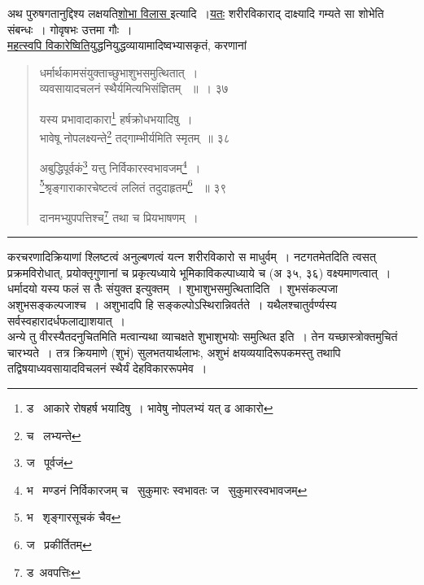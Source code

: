 \documentclass[11pt, openany]{book}
\begin{document}
अथ पुरुषगतानुद्दिश्य लक्षयति\underline{शोभा विलास }इत्यादि~।\underline{यतः} शरीरविकाराद् दाक्ष्यादि गम्यते सा शोभेति संबन्धः~। गोवृषभः उत्तमा गौः~। \\

\underline{महत्स्वपि विकारेष्विति}युद्धनियुद्धव्यायामादिष्वभ्यासकृतं, करणानां 

\newpage

\begin{quote}
 {\na धर्मार्थकामसंयुक्ताच्छुभाशुभसमुत्थितात्~। \\
व्यवसायादचलनं स्थैर्यमित्यभिसंज्ञितम् ~॥~। ३७ 

यस्य प्रभावादाकारा\renewcommand{\thefootnote}{1}\footnote{ड \textendash\ आकारे रोषहर्ष भयादिषु~। भावेषु नोपलभ्यं यत् ढ आकारो } हर्षक्रोधभयादिषु~।\\ 
भावेषू नोपलक्ष्यन्ते\renewcommand{\thefootnote}{2}\footnote{च \textendash\ लभ्यन्ते} तद्गाम्भीर्यमिति स्मृतम्~॥ ३८ 

अबुद्धिपूर्वकं\renewcommand{\thefootnote}{3}\footnote{ज \textendash\ पूर्वजं} यत्तु निर्विकारस्वभावजम्\renewcommand{\thefootnote}{4}\footnote{भ \textendash\ मण्डनं निर्विकारजम् च \textendash\ सुकुमारः स्वभावतः ज \textendash\ सुकुमारस्वभावजम्}~।\\ 
\renewcommand{\thefootnote}{5}\footnote{भ \textendash\ शृङ्गारसूचकं चैव }श्रृङ्गाराकारचेष्टत्वं ललितं तदुदाहृतम्\renewcommand{\thefootnote}{6}\footnote{ज \textendash\ प्रकीर्तितम् } ~॥ ३९ 

दानमभ्युपपत्तिश्च\renewcommand{\thefootnote}{7}\footnote{ड\textendash\ अवपत्तिः } तथा च प्रियभाषणम्~। }
\end{quote}

\hrule

\vspace{2mm}

\noindent
करचरणादिक्रियाणां श्लिष्टत्वं अनुल्बणत्वं यत्न शरीरविकारो स माधुर्वम्~। नटगतमेतदिति त्वसत् प्रक्रमविरोधात्, प्रयोक्तृगुणानां च प्रकृत्यध्याये भूमिकाविकल्पाध्याये च (अ ३५, ३६) वक्ष्यमाणत्वात्~। \\

धर्मादयो यस्य फलं स तैः संयुक्त इत्युक्तम्~। शुभाशुभसमुत्थितादिति~। शुभसंकल्पजा अशुभसङ्कल्पजाश्च~। अशुभादपि हि सङ्कल्पोऽस्थिरान्निवर्तते~। यथैलश्चातुर्वर्ण्यस्य सर्वस्वहारादर्धफलाद्याशयात्~।\\

अन्ये तु वीरस्यैतदनुचितमिति मत्वान्यथा व्याचक्षते शुभाशुभयोः समुत्थित इति~। तेन यच्छास्त्रोक्तमुचितं चारभ्यते~। तत्र क्रियमाणे (शुभं) सुलभतयार्थलाभः, अशुभं क्षयव्ययादिरूपकमस्तु तथापि तद्विषयाध्यवसायादविचलनं स्थैर्यं देहविकाररूपमेव~। \\
\end{document}
